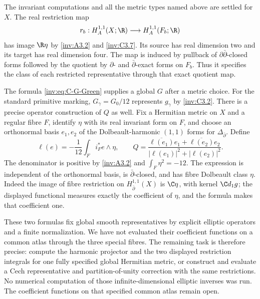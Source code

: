 \begin{question}\label{inv:C3.8}
The invariant computations and all the metric types named above are
settled for $X$.  The real restriction map
\[
r_b:H_A^{1,1}(X;\R)\longrightarrow H_A^{1,1}(F_b;\R)
\]
has image $\R\eta$ by \ref{inv:A3.2} and \ref{inv:C3.7}.  Its source has real dimension
two and its target has real dimension four.  The map is induced by pullback of $\partial\bar\partial$-closed forms followed by the quotient by $\partial$- and $\bar\partial$-exact forms on $F_b$. Thus it specifies the class of each restricted representative through that exact quotient map.

The formula \eqref{inv:eq:C-G-Green} supplies a global $G$ after a metric
choice.  For the standard primitive marking, $G_\gamma=G_0/12$
represents $g_\gamma$ by \ref{inv:C3.2}.  There is a precise operator
construction of $Q$ as well.  Fix a Hermitian metric on $X$ and a
regular fibre $F$, identify $\eta$ with its real invariant form on
$F$, and choose an orthonormal basis $e_1,e_2$ of the Dolbeault-harmonic
$(1,1)$ forms for $\Delta_{\bar\partial}$.  Define
\[
\ell(e)=-\frac1{12}\int_F i_F^*e\wedge\eta,\qquad
Q=\frac{\overline{\ell(e_1)}e_1+
            \overline{\ell(e_2)}e_2}
          {|\ell(e_1)|^2+|\ell(e_2)|^2}.
\]
The denominator is positive by \ref{inv:A3.2} and
$\int_F\eta^2=-12$.  The expression is independent of the
orthonormal basis, is $\bar\partial$-closed, and has fibre
Dolbeault class $\eta$.  Indeed the image of fibre restriction on
$H^{1,1}_{\bar\partial}(X)$ is $\C\eta$, with kernel
$\C d_1g$; the displayed functional measures exactly the coefficient
of $\eta$, and the formula makes that coefficient one.

These two formulas fix global smooth representatives by explicit
elliptic operators and a finite normalization.  We have not evaluated
their coefficient functions on a common atlas through the three
special fibres.  The remaining task is therefore precise: compute
the harmonic projector and the two displayed restriction integrals
for one fully specified global Hermitian metric, or construct and
evaluate a Cech representative and partition-of-unity correction
with the same restrictions.  No numerical computation of those
infinite-dimensional elliptic inverses was run.  The coefficient functions on that specified common atlas remain open.
\end{question}
